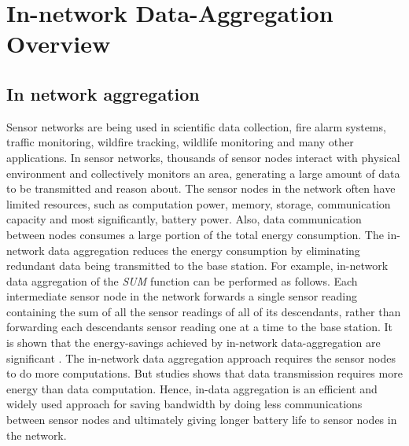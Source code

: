 \chapter{In-network Data-Aggregation Overview} %
\label{cha:In-network Data-Aggregation Overview}

\section{In network aggregation}
	Sensor networks are being used in scientific data collection, fire alarm systems, traffic monitoring, wildfire tracking, wildlife monitoring and many other applications.
	In sensor networks, thousands of sensor nodes interact with physical environment and collectively monitors an area, generating a large amount of data to be transmitted and reason about.
	The sensor nodes in the network often have limited resources, such as computation power, memory, storage, communication capacity and most significantly, battery power.
	Also, data communication between nodes consumes a large portion of the total energy consumption. 
	The in-network data aggregation reduces the energy consumption by eliminating redundant data being transmitted to the base station.
	For example, in-network data aggregation of the \textit{SUM} function can be performed as follows. 
	Each intermediate sensor node in the network forwards a single sensor reading containing the sum of all the sensor readings of all of its descendants, rather than forwarding each descendants sensor reading one at a time to the base station.
	It is shown that the energy-savings achieved by in-network data-aggregation are significant \cite{madden2002tag}.
	The in-network data aggregation approach requires the sensor nodes to do more computations.
	But studies shows that data transmission requires more energy than data computation. 
	Hence, in-data aggregation is an efficient and widely used approach for saving bandwidth by doing less communications between sensor nodes and ultimately giving longer battery life to sensor nodes in the network. 

